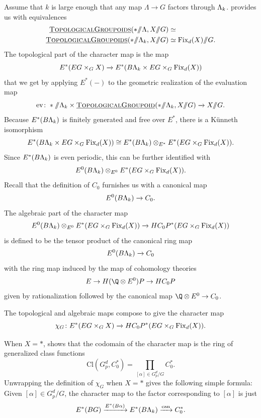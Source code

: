 Assume that \(k\) is large enough that any map \(\Lambda \rightarrow G\) factors through \(\Lambda_k\).
 provides us with equivalences
\begin{align*}
\InternalHom{TopologicalGroupoids}(* \mmod \Lambda, X \mmod G) & \simeq \\
\InternalHom{TopologicalGroupoids}(* \mmod \Lk, X \mmod G) & \simeq \Fix_d(X)\mmod G.
\end{align*}
The topological part of the character map is the map
\[
E^*(EG \times_G X) \xrightarrow{} E^*(B\Lambda_k \times EG\times_G \operatorname{Fix}_d(X))
\]
that we get by applying \(E^*(-)\) to the geometric realization of the evaluation map
\[
\mathrm{ev} \colon * \mmod \Lk \times \InternalHom{TopologicalGroupoid}(* \mmod \Lk, X \mmod G) \xrightarrow{} X \mmod G.
\]
Because \(E^*(B\Lambda_k)\) is finitely generated and free over \(E^*\), there is a K\"unneth isomorphism
\[
E^*(B\Lambda_k \times EG\times_G \operatorname{Fix}_d(X)) \cong E^*(B\Lambda_k) \otimes_{E^*} E^*(EG \times_G \operatorname{Fix}_d(X)).
\]
Since \(E^*(B\Lambda_k)\) is even periodic, this can be further identified with
\[
E^0(B\Lambda_k) \otimes_{E^0} E^*(EG \times_G \operatorname{Fix}_d(X)).
\]
Recall that the definition of \(C_0\) furnishes us with a canonical map
\[
E^0(B\Lambda_k) \xrightarrow{} C_0.
\]
The algebraic part of the character map
\[
E^0(B\Lambda_k) \otimes_{E^0} E^*(EG \times_G \operatorname{Fix}_d(X)) \xrightarrow{} HC_{0}P^{*}(EG \times_G \operatorname{Fix}_d(X)) 
\]
is defined to be the tensor product of the canonical ring map
\[
E^0(B\Lambda_k) \xrightarrow{} C_0
\]
with the ring map induced by the map of cohomology theories
\[
E \rightarrow H(\Q \otimes E^0)P \rightarrow HC_0P
\]
given by rationalization followed by the canonical map \(\Q \otimes E^0 \rightarrow C_0\).

The topological and algebraic maps compose to give the character map
\[
\chi_G \colon E^*(EG \times_G X) \xrightarrow{} HC_{0}P^{*}(EG \times_G \operatorname{Fix}_d(X)).
\]


\begin{example} \label{app:charmapexample}
When \(X = \ast\),  shows that the codomain of the character map is the ring of generalized class functions 
\[
\mathrm{Cl}(G_{p}^{d}, C_{0}^{*}) = \prod_{[\alpha] \in G_{p}^{d}/G} C_{0}^*. 
\]
Unwrapping the definition of \(\chi_G\) when \(X = \ast\) gives the following simple formula: Given \([\alpha] \in G_{p}^{d}/G\), the character map to the factor corresponding to \([\alpha]\) is just
\[
E^*(BG) \xrightarrow{E^*(B\alpha)} E^*(B\Lambda_k) \xrightarrow{\text{can}} C_{0}^{*}.
\]
\end{example}


